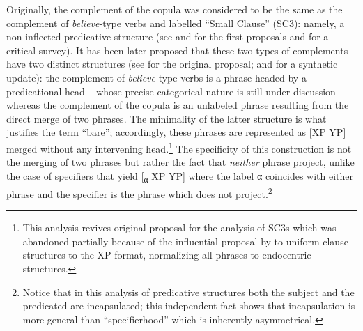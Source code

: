 \documentclass[output=paper]{langsci/langscibook}
\begin{document}
Originally, the complement of the copula was considered to be the same as the
complement of \emph{believe}-type verbs and labelled “Small Clause”
(\gls{SC3}): namely, a non-inflected predicative structure (see
\citealt{Williams1975} and \citealt{Stowell1978} for the first proposals and
\citealt{Graffi2001} for a critical survey). It has been later proposed that
these two types of complements have two distinct structures (see
\citealt{Moro1997} for the original proposal; and \citealt{Moro2017a,Moro2017b}
for a synthetic update): the complement of \emph{believe}-type verbs is a
phrase headed by a predicational head – whose precise categorical nature is
still under discussion – whereas the complement of the copula is an unlabeled
phrase resulting from the direct merge of two phrases. The minimality of the
latter structure is what justifies the term “bare”; accordingly, these phrases
are represented as [XP YP] merged without any intervening head.\footnote{This
    analysis revives  original proposal for the analysis
of \glspl{SC3} which was abandoned partially because of the influential proposal by
 to uniform clause structures to the XP format,
normalizing all phrases to endocentric structures.}  The specificity of this
construction is not the merging of two phrases but rather the fact that
\emph{neither} phrase project, unlike the case of specifiers that yield
[\textsubscript{α} XP YP] where the label α coincides with
either phrase and the specifier is the phrase which does not
project.\footnote{Notice that in this analysis of predicative structures both
    the subject and the predicated are incapsulated; this independent fact
    shows that incapsulation is more general than “specifierhood” which is
inherently asymmetrical.}
\end{document}
